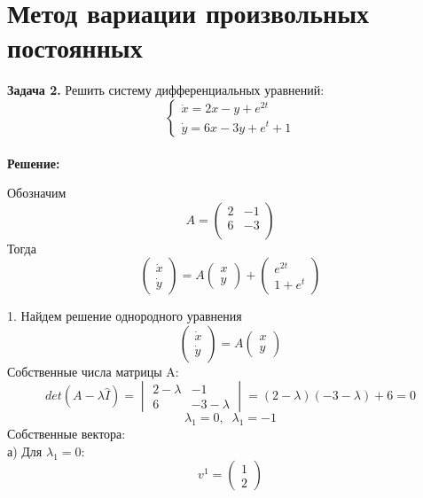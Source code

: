 \documentclass[10pt]{report}
\begin{document}
\section {Метод вариации произвольных постоянных}
\textbf{Задача 2.} Решить систему дифференциальных уравнений: 
\begin{equation}
\left\{
\begin{array}{lr}
\dot{x} = 2x-y+e^{2t}\\
\dot{y} = 6x-3y+e^t+1
\end{array}
\right.
\end{equation}\\
\textbf{Решение:} \par
Обозначим 
\[
A = \left(
\begin{array}{cc}
2 & -1\\
6 & -3\\
\end{array}
\right)\]
Тогда
\[
\left(
\begin{array}{c}
\dot{x}\\
\dot{y}
\end{array}
\right)=
A
\left(
\begin{array}{c}
x\\
y
\end{array}
\right)
+
\left(
\begin{array}{c}
e^{2t}\\
1+e^t
\end{array}
\right)
\]

1. Найдем решение однородного уравнения
\[\left(
\begin{array}{c}
\dot{x}\\
\dot{y}
\end{array}
\right)=
A
\left(
\begin{array}{c}
x\\
y
\end{array}
\right)\]
Собственные числа матрицы A:
\[det(A-\lambda \hat{I})=
\begin{vmatrix}
2-\lambda & -1 \\
6 & -3-\lambda
\end{vmatrix}
=(2-\lambda)(-3-\lambda)+6=0\]
\[\lambda_1 =0, \; \; \lambda_1 =-1\]
Собственные вектора:\\

а) Для $\lambda_1=0:$
\[v^1=
\left(
\begin{array}{c}
1\\
2
\end{array}
\right)
\]
\end{document}
